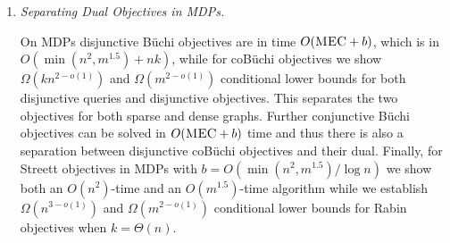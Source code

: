 \documentclass[11pt,letterpaper]{article}
\newif\iffullversion
\newcommand{\infull}[1]{\iffullversion #1\fi}
\begin{document}
\begin{enumerate}
\begin{enumerate}
\item
\emph{Separating Dual Objectives in MDPs.}	
		\infull{First, consider Büchi and coBüchi objectives in MDPs.}
		On MDPs disjunctive Büchi objectives are in time $O(\textsc{MEC} + b)$, which is in 
		$O(\min(n^2, m^{1.5}) + n k)$, while for coBüchi objectives
		we show $\Omega(k n^{2-o(1)})$ and $\Omega(m^{2-o(1)})$ conditional lower bounds for 
		both disjunctive queries and disjunctive objectives. This separates the 
		two objectives for both sparse and dense graphs.
		Further conjunctive Büchi objectives can be solved in $O(\textsc{MEC} + b)$
		time and thus there is also a separation between disjunctive coBüchi
		objectives and their dual.
		Finally, for Streett objectives in MDPs with $b = O(\min(n^2, m^{1.5}) / \log n)$ 
		we show both an $O(n^2)$-time and an $O(m^{1.5})$-time algorithm while 
		we establish $\Omega(n^{3-o(1)})$ and 
		$\Omega(m^{2-o(1)})$ conditional lower bounds for Rabin objectives
		when $k = \Theta(n)$.
		

\end{enumerate}
\end{enumerate}
\end{document}
